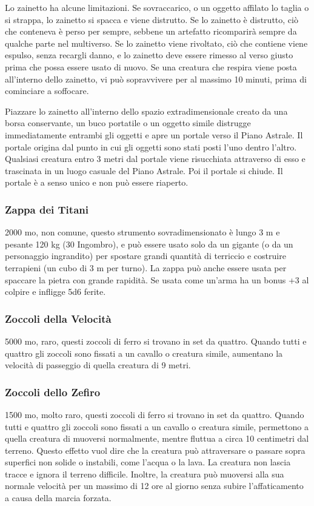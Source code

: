 \begin{multicols}{2}
Lo zainetto ha alcune limitazioni. Se sovraccarico, o un oggetto affilato lo taglia o si strappa, lo zainetto si spacca e viene distrutto. Se lo zainetto è distrutto, ciò che conteneva è perso per sempre, sebbene un artefatto ricomparirà sempre da qualche parte nel multiverso. Se lo zainetto viene rivoltato, ciò che contiene viene espulso, senza recargli danno, e lo zainetto deve essere rimesso al verso giusto prima che possa essere usato di nuovo. Se una creatura che respira viene posta all'interno dello zainetto, vi può sopravvivere per al massimo 10 minuti, prima di cominciare a soffocare.

Piazzare lo zainetto all'interno dello spazio extradimensionale creato da una borsa conservante, un buco portatile o un oggetto simile distrugge immediatamente entrambi gli oggetti e apre un portale verso il Piano Astrale. Il portale origina dal punto in cui gli oggetti sono stati posti l'uno dentro l'altro. Qualsiasi creatura entro 3 metri dal portale viene risucchiata attraverso di esso e trascinata in un luogo casuale del Piano Astrale. Poi il portale si chiude. Il portale è a senso unico e non può essere riaperto.

\subsubsection*{Zappa dei Titani}
2000 mo, non comune, questo strumento sovradimensionato è lungo 3 m e pesante 120 kg (30 Ingombro), e può essere usato solo da un gigante (o da un personaggio ingrandito) per spostare grandi quantità di terriccio e costruire terrapieni (un cubo di 3 m per turno). La zappa può anche essere usata per spaccare la pietra con grande rapidità. Se usata come un'arma ha un bonus +3 al colpire e infligge 5d6 ferite.

\subsubsection*{Zoccoli della Velocità}
5000 mo, raro, questi zoccoli di ferro si trovano in set da quattro. Quando tutti e quattro gli zoccoli sono fissati a un cavallo o creatura simile, aumentano la velocità di passeggio di quella creatura di 9 metri.

\subsubsection*{Zoccoli dello Zefiro}
1500 mo, molto raro, questi zoccoli di ferro si trovano in set da quattro. Quando tutti e quattro gli zoccoli sono fissati a un cavallo o creatura simile, permettono a quella creatura di muoversi normalmente, mentre fluttua a circa 10 centimetri dal terreno. Questo effetto vuol dire che la creatura può attraversare o passare sopra superfici non solide o instabili, come l'acqua o la lava. La creatura non lascia tracce e ignora il terreno difficile. Inoltre, la creatura può muoversi alla sua normale velocità per un massimo di 12 ore al giorno senza subire l'affaticamento a causa della marcia forzata.

\end{multicols}

